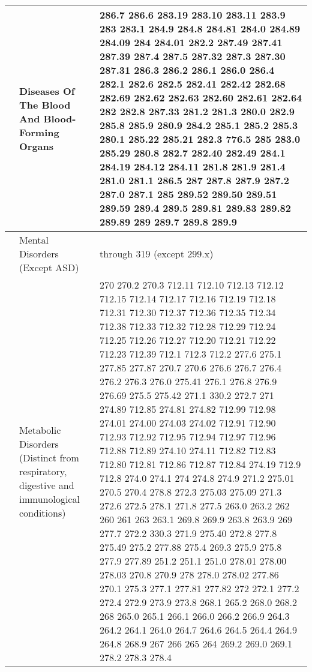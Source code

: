 \begin{longtable}{|R{.05in}|L{.5in}||L{5.75in}|}
   &  Diseases Of The Blood And Blood-Forming Organs &  286.7 286.6 283.19 283.10 283.11 283.9 283 283.1 284.9 284.8 284.81 284.0 284.89 284.09 284 284.01 282.2 287.49 287.41 287.39 287.4 287.5 287.32 287.3 287.30 287.31 286.3 286.2 286.1 286.0 286.4 282.1 282.6 282.5 282.41 282.42 282.68 282.69 282.62 282.63 282.60 282.61 282.64 282 282.8 287.33 281.2 281.3 280.0 282.9 285.8 285.9 280.9 284.2 285.1 285.2 285.3 280.1 285.22 285.21 282.3 776.5 285 283.0 285.29 280.8 282.7 282.40 282.49 284.1 284.19 284.12 284.11 281.8 281.9 281.4 281.0 281.1 286.5 287 287.8 287.9 287.2 287.0 287.1 285 289.52 289.50 289.51 289.59 289.4 289.5 289.81 289.83 289.82 289.89 289 289.7 289.8 289.9
  \\\hline
   & Mental Disorders (Except ASD) &  through 319 (except 299.x) \\\hline
   & Metabolic Disorders (Distinct from respiratory, digestive and immunological conditions) &  270 270.2 270.3 712.11 712.10 712.13 712.12 712.15 712.14 712.17 712.16 712.19 712.18 712.31 712.30 712.37 712.36 712.35 712.34 712.38 712.33 712.32 712.28 712.29 712.24 712.25 712.26 712.27 712.20 712.21 712.22 712.23 712.39 712.1 712.3 712.2 277.6 275.1 277.85 277.87 270.7 270.6 276.6 276.7 276.4 276.2 276.3 276.0 275.41 276.1 276.8 276.9 276.69 275.5 275.42 271.1 330.2 272.7 271 274.89 712.85 274.81 274.82 712.99 712.98 274.01 274.00 274.03 274.02 712.91 712.90 712.93 712.92 712.95 712.94 712.97 712.96 712.88 712.89 274.10 274.11 712.82 712.83 712.80 712.81 712.86 712.87 712.84 274.19 712.9 712.8 274.0 274.1 274 274.8 274.9 271.2 275.01 270.5 270.4 278.8 272.3 275.03 275.09 271.3 272.6 272.5 278.1 271.8 277.5 263.0 263.2 262 260 261 263 263.1 269.8 269.9 263.8 263.9 269 277.7 272.2 330.3 271.9 275.40 272.8 277.8 275.49 275.2 277.88 275.4 269.3 275.9 275.8 277.9 277.89 251.2 251.1 251.0 278.01 278.00 278.03 270.8 270.9 278 278.0 278.02 277.86 270.1 275.3 277.1 277.81 277.82 272 272.1 277.2 272.4 272.9 273.9 273.8 268.1 265.2 268.0 268.2 268 265.0 265.1 266.1 266.0 266.2 266.9 264.3 264.2 264.1 264.0 264.7 264.6 264.5 264.4 264.9 264.8 268.9 267 266 265 264 269.2 269.0 269.1 278.2 278.3 278.4\\\hline

\end{longtable}
